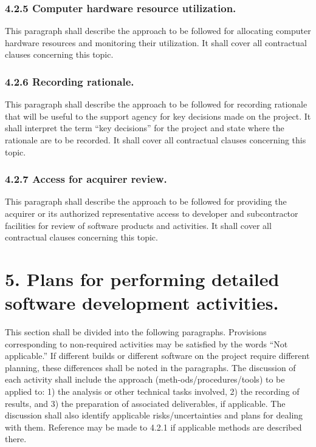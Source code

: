 \subsubsection{4.2.5 Computer hardware resource utilization.}

This paragraph shall describe the approach to be followed for allocating
computer hardware resources and monitoring their utilization. It shall
cover all contractual clauses concerning this topic.

\subsubsection{4.2.6 Recording rationale.}

This paragraph shall describe the approach to be followed for recording
rationale that will be useful to the support agency for key decisions
made on the project. It shall interpret the term ``key decisions'' for
the project and state where the rationale are to be recorded. It shall
cover all contractual clauses concerning this topic.

\subsubsection{4.2.7 Access for acquirer review.}

This paragraph shall describe the approach to be followed for providing
the acquirer or its authorized representative access to developer and
subcontractor facilities for review of software products and activities.
It shall cover all contractual clauses concerning this topic.

\section{5. Plans for performing detailed software development
activities.}

This section shall be divided into the following paragraphs. Provisions
corresponding to non-required activities may be satisfied by the words
``Not applicable.'' If different builds or different software on the
project require different planning, these differences shall be noted in
the paragraphs. The discussion of each activity shall include the
approach (meth-ods/procedures/tools) to be applied to: 1) the analysis
or other technical tasks involved, 2) the recording of results, and 3)
the preparation of associated deliverables, if applicable. The
discussion shall also identify applicable risks/uncertainties and plans
for dealing with them. Reference may be made to 4.2.1 if applicable
methods are described there.

